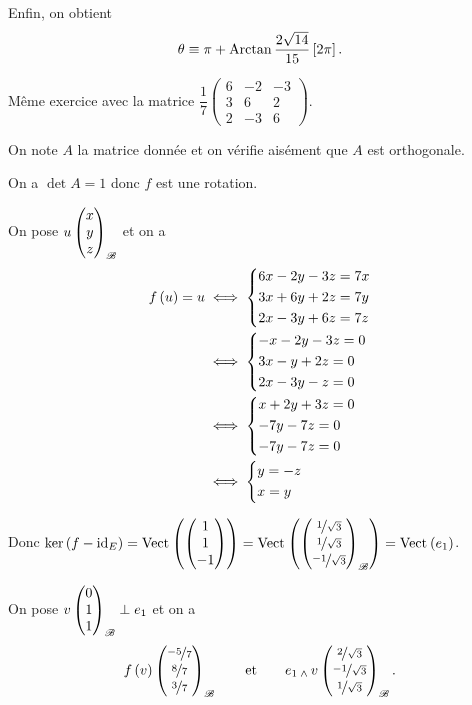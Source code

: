 \begin{corr}
Enfin, on obtient \[\theta\equiv\pi+\operatorname{Arctan}\dfrac{2\sqrt{14}}{15}\left[2\pi\right].\]
\end{corr}

\begin{exo}
Même exercice avec la matrice \(\dfrac{1}{7}\begin{pmatrix}
6 & -2 & -3 \\
3 & 6 & 2 \\
2 & -3 & 6
\end{pmatrix}\).
\end{exo}

\begin{corr}
On note \(A\) la matrice donnée et on vérifie aisément que \(A\) est orthogonale.

On a \(\det A=1\) donc \(f\) est une rotation.

On pose \(u\begin{pmatrix}x\\y\\z\end{pmatrix}_{\mathscr{B}}\) et on a \[\begin{aligned}
f\left(u\right)=u&\iff\begin{dcases}
6x-2y-3z=7x \\
3x+6y+2z=7y \\
2x-3y+6z=7z
\end{dcases} \\
&\iff\begin{dcases}
-x-2y-3z=0 \\
3x-y+2z=0 \\
2x-3y-z=0
\end{dcases} \\
&\iff\begin{dcases}
x+2y+3z=0 \\
-7y-7z=0 \\
-7y-7z=0
\end{dcases} \\
&\iff\begin{dcases}
y=-z \\
x=y
\end{dcases}
\end{aligned}\]

Donc \(\ker\paren{f-\id{E}}=\Vect{\tcoords{1}{1}{-1}}=\Vect{\tcoords{\nicefrac{1}{\sqrt{3}}}{\nicefrac{1}{\sqrt{3}}}{\nicefrac{-1}{\sqrt{3}}}_{\fami{B}}}=\Vect{e_1}\).

On pose \(v\begin{pmatrix}0\\1\\1\end{pmatrix}_{\mathscr{B}}\perp e_1\) et on a \[f\left(v\right)\begin{pmatrix}\nicefrac{-5}{7}\\\nicefrac{8}{7}\\\nicefrac{3}{7}\end{pmatrix}_{\mathscr{B}}\qquad\text{et}\qquad e_1\operatorname{_\wedge} v\begin{pmatrix}\nicefrac{2}{\sqrt{3}}\\\nicefrac{-1}{\sqrt{3}}\\\nicefrac{1}{\sqrt{3}}\end{pmatrix}_{\mathscr{B}}.\]


\end{corr}
